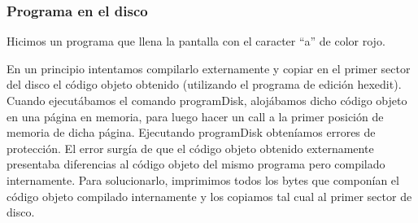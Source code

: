 \documentclass[a4paper,10pt]{article}
\begin{document}
  \subsubsection{Programa en el disco}
    Hicimos un programa que llena la pantalla con el caracter ``a'' de color rojo.\par
    En un principio intentamos compilarlo externamente y copiar en el primer sector del disco el código objeto obtenido
    (utilizando el programa de edición hexedit). Cuando ejecutábamos el comando programDisk, alojábamos dicho código objeto
    en una página en memoria, para luego hacer un call a la primer posición de memoria de dicha página.	Ejecutando programDisk 
    obteníamos errores de protección. El error surgía de que el código objeto obtenido externamente presentaba diferencias al código
    objeto del mismo programa pero compilado internamente. Para solucionarlo, imprimimos todos los bytes que componían el código objeto
    compilado internamente y los copiamos tal cual al primer sector de disco.
    
\end{document}
